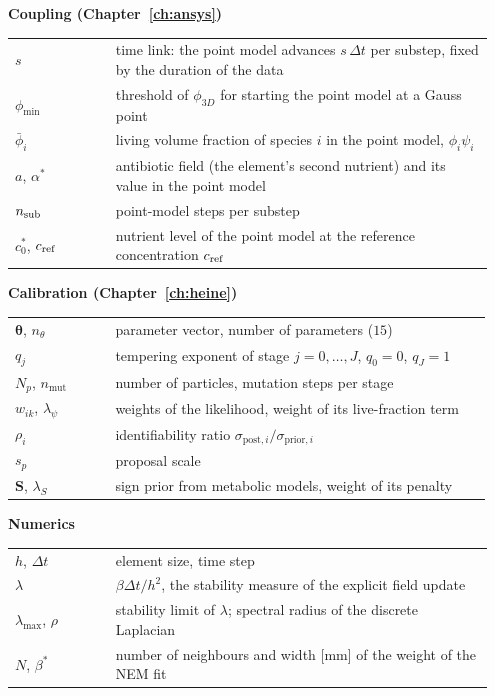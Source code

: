 \documentclass[12pt, a4paper, twoside]{report}
\newcommand{\btheta}{\boldsymbol{\theta}}
\begin{document}
\medskip\noindent\textbf{Coupling (Chapter~\ref{ch:ansys})}\\[2pt]
\begin{tabular}{@{}p{0.2\linewidth}p{0.75\linewidth}@{}}
$s$ & time link: the point model advances $s\,\Delta t$ per substep, fixed by the duration of the data\\
$\phi_{\min}$ & threshold of $\phi_{3D}$ for starting the point model at a Gauss point\\
$\bar\phi_i$ & living volume fraction of species $i$ in the point model, $\phi_i\psi_i$\\
$a$, $\alpha^*$ & antibiotic field (the element's second nutrient) and its value in the point model\\
$n_{\rm sub}$ & point-model steps per substep\\
$c^*_0$, $c_{\rm ref}$ & nutrient level of the point model at the reference concentration $c_{\rm ref}$\\
\end{tabular}

\medskip\noindent\textbf{Calibration (Chapter~\ref{ch:heine})}\\[2pt]
\begin{tabular}{@{}p{0.2\linewidth}p{0.75\linewidth}@{}}
$\btheta$, $n_\theta$ & parameter vector, number of parameters ($15$)\\
$q_j$ & tempering exponent of stage $j=0,\dots,J$, $q_0=0$, $q_J=1$\\
$N_p$, $n_{\mathrm{mut}}$ & number of particles, mutation steps per stage\\
$w_{ik}$, $\lambda_\psi$ & weights of the likelihood, weight of its live-fraction term\\
$\rho_i$ & identifiability ratio $\sigma_{\mathrm{post},i}/\sigma_{\mathrm{prior},i}$\\
$s_p$ & proposal scale\\
$\mathbf S$, $\lambda_S$ & sign prior from metabolic models, weight of its penalty\\
\end{tabular}

\medskip\noindent\textbf{Numerics}\\[2pt]
\begin{tabular}{@{}p{0.2\linewidth}p{0.75\linewidth}@{}}
$h$, $\Delta t$ & element size, time step\\
$\lambda$ & $\beta\Delta t/h^2$, the stability measure of the explicit field update\\
$\lambda_{\max}$, $\rho$ & stability limit of $\lambda$; spectral radius of the discrete Laplacian\\
$N$, $\beta^*$ & number of neighbours and width [mm] of the weight of the NEM fit\\
\end{tabular}
\end{document}
